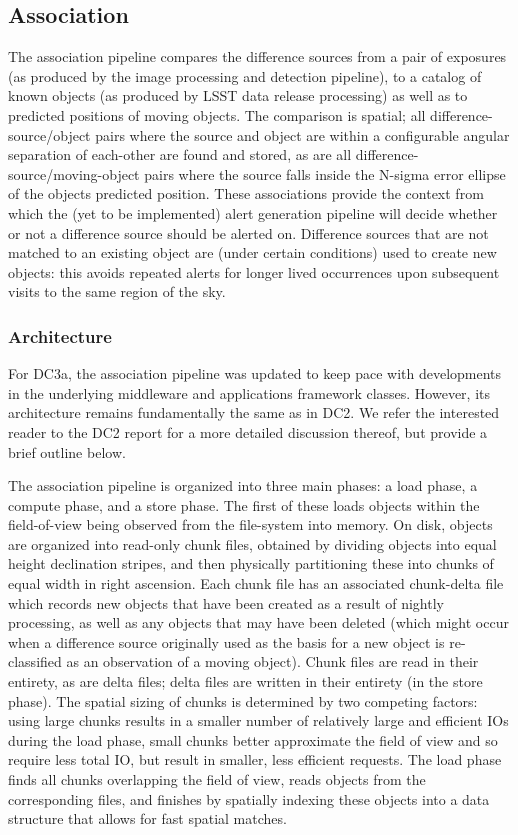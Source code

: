 
\subsection{Association}

The association pipeline compares the difference sources from a pair of
exposures (as produced by the image processing and detection pipeline), to
a catalog of known objects (as produced by LSST data release processing) as
well as to predicted positions of moving objects. The comparison is spatial;
all difference-source/object pairs where the source and object are within a
configurable angular separation of each-other are found and stored, as are
all difference-source/moving-object pairs where the source falls inside the
N-sigma error ellipse of the objects predicted position. These associations
provide the context from which the (yet to be implemented) alert generation
pipeline will decide whether or not a difference source should be alerted on.
Difference sources that are not matched to an existing object are (under
certain conditions) used to create new objects: this avoids repeated alerts
for longer lived occurrences upon subsequent visits to the same region
of the sky.

\subsubsection{Architecture}

For DC3a, the association pipeline was updated to keep pace with developments
in the underlying middleware and applications framework classes. However, its
architecture remains fundamentally the same as in DC2. We refer the interested
reader to the DC2 report for a more detailed discussion thereof, but provide a
brief outline below.

The association pipeline is organized into three main phases: a load phase, a
compute phase, and a store phase. The first of these loads objects within the
field-of-view being observed from the file-system into memory. On disk,
objects are organized into read-only chunk files, obtained by dividing objects
into equal height declination stripes, and then physically partitioning these
into chunks of equal width in right ascension. Each chunk file has an
associated chunk-delta file which records new objects that have been created
as a result of nightly processing, as well as any objects that may have been
deleted (which might occur when a difference source originally used as the
basis for a new object is re-classified as an observation of a moving object).
Chunk files are read in their entirety, as are delta files; delta files are
written in their entirety (in the store phase). The spatial sizing of chunks
is determined by two competing factors: using large chunks results in a
smaller number of relatively large and efficient IOs during the load phase,
small chunks better approximate the field of view and so require less total
IO, but result in smaller, less efficient requests. The load phase finds
all chunks overlapping the field of view, reads objects from the corresponding
files, and finishes by spatially indexing these objects into a data structure
that allows for fast spatial matches.


